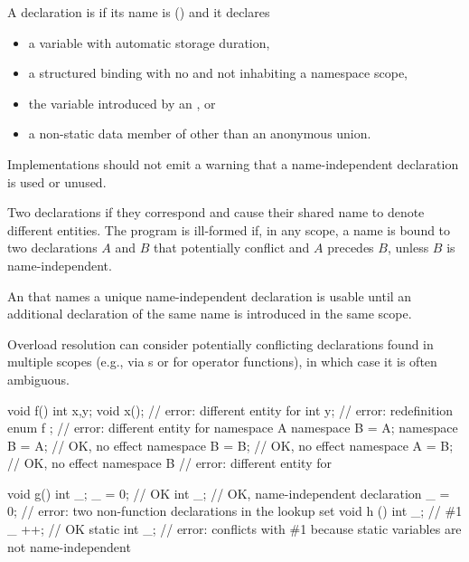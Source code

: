 \pnum
A declaration is 
if its name is \tcode{_} () and it declares
\begin{itemize}
\item
a variable with automatic storage duration,
\item
a structured binding
with no  and
not inhabiting a namespace scope,
\item
the variable introduced by an , or
\item
a non-static data member of other than an anonymous union.
\end{itemize}

\recommended
Implementations should not emit a warning
that a name-independent declaration is used or unused.

\pnum
{}%
Two declarations 
if they correspond and
cause their shared name to denote different entities.
The program is ill-formed
if, in any scope, a name is bound to two declarations $A$ and $B$
that potentially conflict and $A$ precedes $B$,
unless $B$ is name-independent.
\begin{note}
An  that names a unique name-independent declaration
is usable until an additional declaration of the same name
is introduced in the same scope.
\end{note}
\begin{note}
Overload resolution can consider potentially conflicting declarations
found in multiple scopes
(e.g., via s or for operator functions),
in which case it is often ambiguous.
\end{note}
\begin{example}
\begin{codeblock}
void f() {
  int x,y;
  void x();             // error: different entity for 
  int y;                // error: redefinition
}
enum { f };             // error: different entity for 
namespace A {}
namespace B = A;
namespace B = A;        // OK, no effect
namespace B = B;        // OK, no effect
namespace A = B;        // OK, no effect
namespace B {}          // error: different entity for 

void g() {
  int _;
  _ = 0;                // OK
  int _;                // OK, name-independent declaration
  _ = 0;                // error: two non-function declarations in the lookup set
}
void h () {
  int _;                // \#1
  _ ++;                 // OK
  static int _;         // error: conflicts with \#1 because static variables are not name-independent
}
\end{codeblock}
\end{example}


